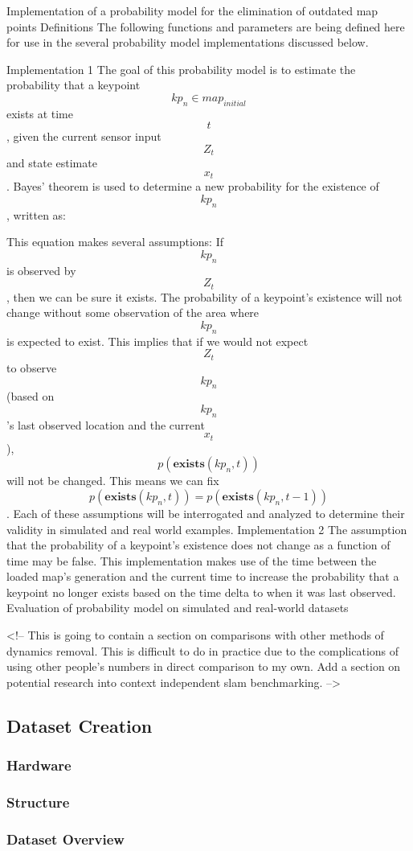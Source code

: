 Implementation of a probability model for the elimination of outdated map points
Definitions
The following functions and parameters are being defined here for use in the several probability model implementations discussed below.


Implementation 1
The goal of this probability model is to estimate the probability that a keypoint $$kp_n\in map_{initial}$$ exists at time $$t$$, given the current sensor input $$Z_t$$ and state estimate $$x_t$$. Bayes’ theorem is used to determine a new probability for the existence of $$kp_n$$, written as:


This equation makes several assumptions:
If $$kp_n$$ is observed by $$Z_t$$, then we can be sure it exists.
The probability of a keypoint’s existence will not change without some observation of the area where $$kp_n$$ is expected to exist. This implies that if we would not expect $$Z_t$$ to observe $$kp_n$$ (based on $$kp_n$$’s last observed location and the current $$x_t$$), $$p(\mathbf{exists}(kp_n,t))$$ will not be changed. This means we can fix $$p(\mathbf{exists}(kp_n,t))=p(\mathbf{exists}(kp_n,t-1))$$.
Each of these assumptions will be interrogated and analyzed to determine their validity in simulated and real world examples.
Implementation 2
The assumption that the probability of a keypoint’s existence does not change as a function of time may be false. This implementation makes use of the time between the loaded map’s generation and the current time to increase the probability that a keypoint no longer exists based on the time delta to when it was last observed.
Evaluation of probability model on simulated and real-world datasets

<!-- This is going to contain a section on comparisons with other methods of dynamics removal.
This is difficult to do in practice due to the complications of using other people's numbers
in direct comparison to my own. Add a section on potential research into context independent
slam benchmarking. -->

\subsection{Dataset Creation}

\subsubsection{Hardware}

\subsubsection{Structure}

\subsubsection{Dataset Overview}